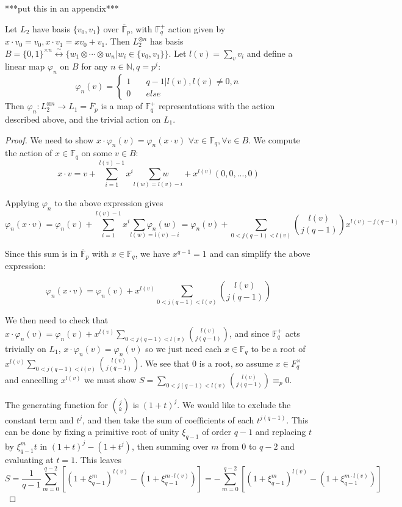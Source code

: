 \documentclass[11pt]{article} %
\begin{document}
***put this in an appendix***
\begin{proposition}Let $L_2$ have basis $\{v_0,v_1\}$ over $\overline{\mathbb{F}}_p$, with $\mathbb{F}_q^{+}$ action given by $x\cdot v_0 = v_0,x \cdot v_1 = xv_0 + v_1$. Then $L_2^{\otimes{n}}$ has basis $B =\{0,1\}^{\times n}\overset{\sim}{\longleftrightarrow} \{w_1 \otimes \cdots \otimes w_n | w_i \in \{v_0,v_1\}\}$. Let $l(v) = \sum_v{v_i}$ and define a linear map $\varphi_n$ on $B$ for any $n \in \mathbb{N}, q = p^i$:
$$
\varphi_n(v) = \left\{
        \begin{array}{ll}
            1 & \quad q-1| l(v), l(v) \neq 0,n \\
            0 & \quad else
        \end{array}
    \right.
$$
\noindent Then $ \varphi_n: L_2^{\otimes n} \rightarrow L_1=\overline{F}_p$ is a map of $\mathbb{F}_q^{+}$ representations with the action described above, and the trivial action on $L_1$.
\begin{proof}
We need to show $x \cdot \varphi_n(v) = \varphi_n(x \cdot v)$ $\forall x \in \mathbb{F}_q, \forall v \in B$. We compute the action of $x \in \mathbb{F}_q$ on some $v \in B$:
$$
x \cdot v = v +  \underset{i=1}{\sum^{l(v) - 1}}{x^i}\underset{l(w) = l(v)-i}{\sum{w}} + x^{l(v)}(0,0,...,0)
$$

\noindent Applying $\varphi_n$ to the above expression gives
$$
\varphi_n(x\cdot v) = \varphi_n(v) + \underset{i=1}{\sum^{l(v) - 1}}{x^i}\underset{l(w) = l(v)-i}{\sum{\varphi_n(w)}}
= \varphi_n(v) + \sum_{0 < j(q-1) < l(v)}{{l(v)}\choose{j(q-1)}}x^{l(v)-j(q-1)}
$$

\noindent Since this sum is in $\overline{\mathbb{F}}_p$ with $x \in \mathbb{F}_q$, we have $x^{q-1} = 1$ and can simplify the above expression:

$$
\varphi_n(x\cdot v) = \varphi_n(v) + x^{l(v)}\sum_{0 < j(q-1) < l(v)}{{l(v)}\choose{j(q-1)}}
$$

We then need to check that $x \cdot \varphi_n(v) = \varphi_n(v) + x^{l(v)}\sum_{0 < j(q-1) < l(v)}{{l(v)}\choose{j(q-1)}}$, and since $\mathbb{F}_q^+$ acts trivially on $L_1$, $x\cdot \varphi_n(v) = \varphi_n(v)$ so we just need each $x \in \mathbb{F}_q$ to be a root of $x^{l(v)}\sum_{0 < j(q-1) < l(v)}{{l(v)}\choose{j(q-1)}}$. We see that $0$ is a root, so assume $x \in F_q^{\times}$ and cancelling $x^{l(v)}$ we must show $S = \sum_{0 < j(q-1) < l(v)}{{l(v)}\choose{j(q-1)}} \equiv_p 0$.

The generating function for ${j}\choose{k}$ is $(1 + t)^j$. We would like to exclude the constant term and $t^j$, and then take the sum of coefficients of each $t^{j(q-1)}$. This can be done by fixing a primitive root of unity $\xi_{q-1}$ of order $q-1$ and replacing $t$ by $\xi_{q-1}^mt$ in $(1+t)^j-(1+t^j)$, then summing over $m$ from $0$ to $q-2$ and evaluating at $t=1$. This leaves
$$
S = \frac{1}{q-1} \sum_{m=0}^{q-2}[(1 + \xi_{q-1}^m)^{l(v)}-(1 +  \xi_{q-1}^{m\cdot l(v)})] =  - \sum_{m=0}^{q-2}[(1 + \xi_{q-1}^m)^{l(v)}-(1 +  \xi_{q-1}^{m\cdot l(v)})]
$$


\end{proof}
\end{proposition}
\end{document}
